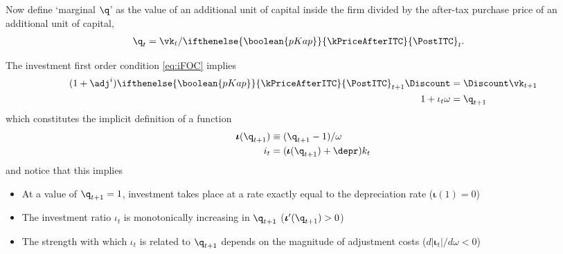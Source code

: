 \documentclass[headings=optiontotocandhead,toc=flat]{handout}
\newcommand{\pkTF}{\ifthenelse{\boolean{pKap}}}
\begin{document}
Now define `marginal $\q$' as the value of an additional unit of capital inside the firm
divided by the after-tax purchase price of an additional unit of capital,  
\begin{equation}\begin{gathered}\begin{aligned}
      \q_{t} & =  \vk_{t}/\pkTF{\kPriceAfterITC}{\PostITC}_{t}.
    \end{aligned}\end{gathered}\end{equation}

The investment first order condition \eqref{eq:iFOC} implies
\begin{equation}\begin{gathered}\begin{aligned}
      (1+\adj^{i})\pkTF{\kPriceAfterITC}{\PostITC}_{t+1}\Discount  & =  \Discount \vk_{t+1}
      \\ 1+\iota_{t}\omega & =  \q_{t+1}
    \end{aligned}\end{gathered}\end{equation}
which constitutes the implicit definition of a function
\begin{equation}\begin{gathered}\begin{aligned}
      \pmb{\iota}(\q_{t+1}) & \equiv  (\q_{t+1}-1)/\omega
      \\ i_{t} & =  (\pmb{\iota}(\q_{t+1})+\depr)k_{t}
    \end{aligned}\end{gathered}\end{equation}
and notice that this implies
\begin{itemize}
\item At a value of $\q_{t+1}=1$, investment takes place at a rate exactly equal to the depreciation rate ($\pmb{\iota}(1)=0$)
\item The investment ratio $\iota_{t}$ is monotonically increasing in $\q_{t+1}$ ($\pmb{\iota}^{\prime}(\q_{t+1})>0$)
\item The strength with which $\iota_{t}$ is related to $\q_{t+1}$ depends on the
  magnitude of adjustment costs ($d |\pmb{\iota}_{t}| / d \omega < 0 $)
\end{itemize}
\end{document}
